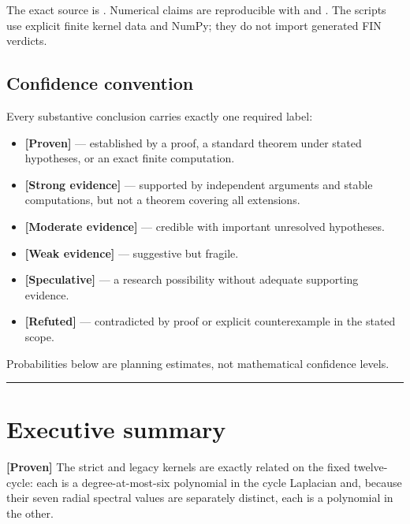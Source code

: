 \documentclass[11pt,a4paper,openany]{report}
\newcommand{\statusProven}{\textcolor{fingreen}{[Proven]}}
\newcommand{\statusStrong}{\textcolor{finblue}{[Strong evidence]}}
\newcommand{\statusModerate}{\textcolor{finviolet}{[Moderate evidence]}}
\newcommand{\statusWeak}{\textcolor{fingray}{[Weak evidence]}}
\newcommand{\statusSpeculative}{\textcolor{finorange}{[Speculative]}}
\newcommand{\statusRefuted}{\textcolor{finred}{[Refuted]}}
\begin{document}
The exact source is . Numerical claims are reproducible with  and . The scripts use explicit finite kernel data and NumPy; they do not import generated FIN verdicts.

\tableofcontents
\clearpage
{}

\section{Confidence convention}

Every substantive conclusion carries exactly one required label:

\begin{itemize}
\item 
\textbf{\statusProven{}} — established by a proof, a standard theorem under stated hypotheses, or an exact finite computation.

\item 
\textbf{\statusStrong{}} — supported by independent arguments and stable computations, but not a theorem covering all extensions.

\item 
\textbf{\statusModerate{}} — credible with important unresolved hypotheses.

\item 
\textbf{\statusWeak{}} — suggestive but fragile.

\item 
\textbf{\statusSpeculative{}} — a research possibility without adequate supporting evidence.

\item 
\textbf{\statusRefuted{}} — contradicted by proof or explicit counterexample in the stated scope.

\end{itemize}

Probabilities below are planning estimates, not mathematical confidence levels.

\par\medskip\hrule\medskip

\chapter{Executive summary}

\textbf{\statusProven{}} The strict and legacy kernels are exactly related on the fixed twelve-cycle: each is a degree-at-most-six polynomial in the cycle Laplacian and, because their seven radial spectral values are separately distinct, each is a polynomial in the other.
\end{document}

